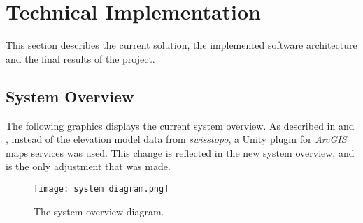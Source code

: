 \section{Technical Implementation}
\label{section:techimpl}
This section describes the current solution, the implemented software architecture and the final results of the project.

\subsection{System Overview}
The following graphics displays the current system overview.
As described in  and , instead of the elevation model data from \emph{swisstopo}, a Unity plugin for \emph{ArcGIS} maps services was used.
This change is reflected in the new system overview, and is the only adjustment that was made.

\begin{figure}[H]
    \texttt{[image: system diagram.png]}
    \caption{The system overview diagram.}
    \label{img:techimpl:system}
\end{figure}

\clearpage

